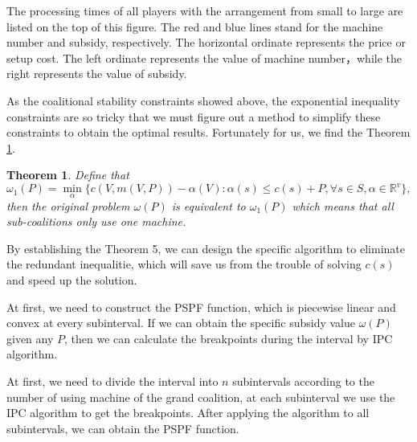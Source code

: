 \documentclass[UTF8]{article}
\newtheorem{thm}{\hspace{2em}Theorem}
\begin{document}
The processing times of all players with the arrangement from small to large are listed on the top of this figure.
The red and blue lines stand for the machine number and subsidy, respectively.
The horizontal ordinate represents the price or setup cost.
The left ordinate represents the value of machine number，while the right represents the value of subsidy.

As the coalitional stability constraints showed above, the exponential inequality constraints are so tricky that we must figure out a method to simplify these constraints to obtain the optimal results. Fortunately for us, we find the Theorem \ref{thm5}.

\begin{thm}\label{thm5}
Define that
\[
  {\omega_1(P)}=\mathop{\min}_{\alpha}\{c(V,m(V,P))-\alpha(V): \alpha(s)\leq c(s)+P,\forall s \in S, \alpha\in\mathbb{R}^{v}\},
\]then the original problem $\omega(P)$ is equivalent to $\omega_1(P)$ which means that all sub-coalitions only use one machine.

\end{thm}

By establishing the Theorem 5, we can design the specific algorithm to eliminate the redundant inequalitie, which will save us from the trouble of solving $c(s)$ and speed up the solution.

At first, we need to construct the PSPF function, which is piecewise linear and convex at every subinterval. If we can obtain the specific subsidy value $\omega(P)$ given any $P$, then we can calculate the breakpoints during the interval by IPC algorithm.

At first, we need to divide the interval into $n$ subintervals according to the  number of using machine of the grand coalition, at each subinterval we use the IPC algorithm to get the breakpoints. After applying the algorithm to all subintervals, we can obtain the PSPF function.
\end{document}
